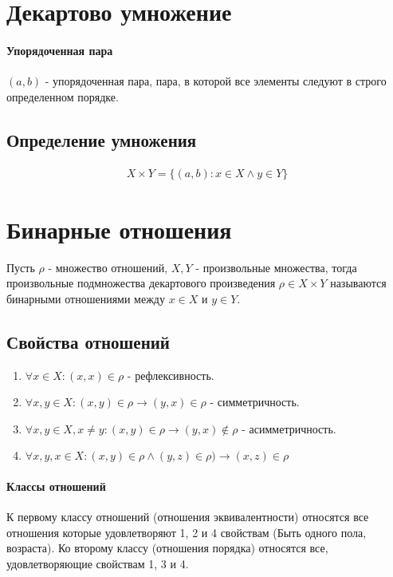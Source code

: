 \documentclass[10pt]{article}
\begin{document}
	\section{Декартово умножение}
		\paragraph{Упорядоченная пара}
		$(a, b)$ - упорядоченная пара, пара, в которой все элементы следуют в строго определенном порядке.
		\subsection{Определение умножения}
		\begin{eqnarray}
			X \times Y = \{(a, b) : x \in X \wedge y \in Y\}
		\end{eqnarray}
		
	\section{Бинарные отношения}
		Пусть $\rho$ - множество отношений, $X, Y$ - произвольные множества, тогда произвольные подмножества декартового произведения $\rho \in X \times Y$ называются бинарными отношениями между $x \in X$ и $y \in Y$.
	
		\subsection{Свойства отношений}
		\begin{enumerate}
			\item $\forall x \in X : (x, x) \in \rho$ - рефлексивность.
			\item $\forall x, y \in X : (x, y) \in \rho \to (y, x) \in \rho$ - симметричность.
			\item $\forall x, y \in X, x \neq y : (x, y) \in \rho \to (y, x) \notin \rho$ - асимметричность.
			\item $\forall x,y,x \in X : (x, y) \in \rho \wedge (y, z) \in \rho) \to (x, z) \in \rho$	
		\end{enumerate}
		
		\paragraph{Классы отношений}
		К первому классу отношений (отношения эквивалентности) относятся все отношения которые удовлетворяют 1, 2 и 4 свойствам (Быть одного пола, возраста). Ко второму классу (отношения порядка) относятся все, удовлетворяющие свойствам 1, 3 и 4.
	
\end{document}
